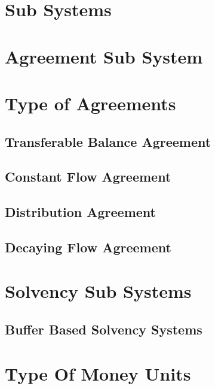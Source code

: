 \documentclass{article}
\begin{document}
\section{Sub Systems}

\section{Agreement Sub System}

\section{Type of Agreements}

\subsection{Transferable Balance Agreement}

\subsection{Constant Flow Agreement}

\subsection{Distribution Agreement}

\subsection{Decaying Flow Agreement}

\section{Solvency Sub Systems}

\subsection{Buffer Based Solvency Systems}

\section{Type Of Money Units}

\newpage

\printbibliography{}
\end{document}
